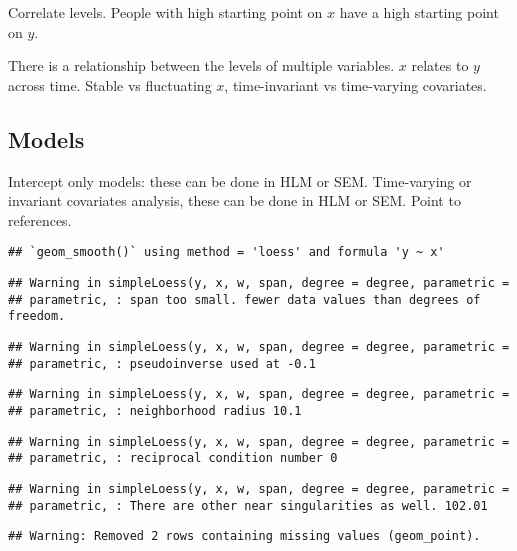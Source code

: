 \documentclass[]{article}
\begin{document}
Correlate levels. People with high starting point on \(x\) have a high
starting point on \(y\).

There is a relationship between the levels of multiple variables. \(x\)
relates to \(y\) across time. Stable vs fluctuating \(x\),
time-invariant vs time-varying covariates.

\hypertarget{models}{%
\subsection{Models}\label{models}}

Intercept only models: these can be done in HLM or SEM. Time-varying or
invariant covariates analysis, these can be done in HLM or SEM. Point to
references.

\begin{verbatim}
## `geom_smooth()` using method = 'loess' and formula 'y ~ x'
\end{verbatim}

\begin{verbatim}
## Warning in simpleLoess(y, x, w, span, degree = degree, parametric =
## parametric, : span too small. fewer data values than degrees of freedom.
\end{verbatim}

\begin{verbatim}
## Warning in simpleLoess(y, x, w, span, degree = degree, parametric =
## parametric, : pseudoinverse used at -0.1
\end{verbatim}

\begin{verbatim}
## Warning in simpleLoess(y, x, w, span, degree = degree, parametric =
## parametric, : neighborhood radius 10.1
\end{verbatim}

\begin{verbatim}
## Warning in simpleLoess(y, x, w, span, degree = degree, parametric =
## parametric, : reciprocal condition number 0
\end{verbatim}

\begin{verbatim}
## Warning in simpleLoess(y, x, w, span, degree = degree, parametric =
## parametric, : There are other near singularities as well. 102.01
\end{verbatim}

\begin{verbatim}
## Warning: Removed 2 rows containing missing values (geom_point).
\end{verbatim}
\end{document}
